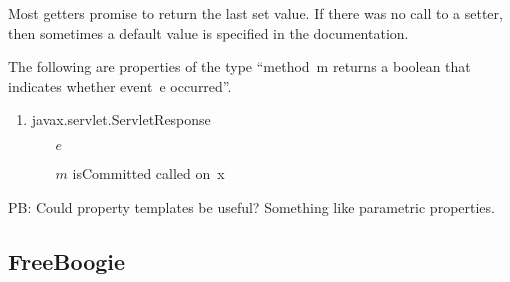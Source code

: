 \documentclass{article} %
\begin{document}
Most getters promise to return the last set value.
If there was no call to a setter, then sometimes a default value is specified in the documentation.

The following are properties of the type ``method~\textsf{m} returns a boolean that indicates whether event~\textsf{e} occurred''.

\begin{enumerate}
\item
\textsf{javax.servlet.ServletResponse}
  \begin{itemize}
  \item[$e$] 
  \item[$m$] \textsf{isCommitted} called on~\textsf{x}
  \end{itemize}
\end{enumerate}

PB: Could property templates be useful?
Something like parametric properties.

\subsection{FreeBoogie} %

\end{document}
